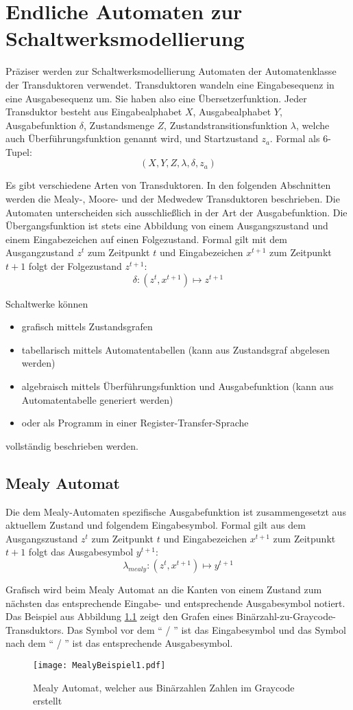\chapter{Endliche Automaten zur Schaltwerksmodellierung}
Präziser werden zur Schaltwerksmodellierung Automaten der Automatenklasse der Transduktoren verwendet. Transduktoren wandeln eine Eingabesequenz in eine Ausgabesequenz um. Sie haben also eine Übersetzerfunktion. Jeder Transduktor besteht aus Eingabealphabet $X$, Ausgabealphabet $Y$, Ausgabefunktion $\delta$, Zustandsmenge $Z$, Zustandstransitionsfunktion $\lambda$, welche auch Überführungsfunktion genannt wird, und Startzustand $z_a$. Formal als 6-Tupel:
$$
	(X,Y,Z,\lambda,\delta,z_a)
$$ 

Es gibt verschiedene Arten von Transduktoren. In den folgenden Abschnitten werden die Mealy-, Moore- und der Medwedew Transduktoren beschrieben. Die Automaten unterscheiden sich ausschließlich in der Art der Ausgabefunktion. Die Übergangsfunktion ist stets eine Abbildung von einem Ausgangszustand und einem Eingabezeichen auf einen Folgezustand. Formal gilt mit dem Ausgangzustand $z^t$ zum Zeitpunkt $t$ und Eingabezeichen $x^{t+1}$ zum Zeitpunkt $t+1$ folgt der Folgezustand $z^{t+1}$:
$$
	\delta : (z^t, x^{t+1}) \mapsto z^{t+1}
$$

Schaltwerke können
\begin{itemize}
  \item grafisch mittels Zustandsgrafen
  \item tabellarisch mittels Automatentabellen (kann aus Zustandsgraf abgelesen werden)
  \item algebraisch mittels Überführungsfunktion und Ausgabefunktion (kann aus Automatentabelle generiert werden)
  \item oder als Programm in einer Register-Transfer-Sprache
\end{itemize}
vollständig beschrieben werden.

\section{Mealy Automat}
Die dem Mealy-Automaten spezifische Ausgabefunktion ist zusammengesetzt aus aktuellem Zustand und folgendem Eingabesymbol. Formal gilt aus dem Ausgangszustand $z^t$ zum Zeitpunkt $t$ und Eingabezeichen $x^{t+1}$ zum Zeitpunkt $t+1$ folgt das Ausgabesymbol $y^{t+1}$:
$$
	\lambda_{mealy} : (z^t, x^{t+1}) \mapsto y^{t+1}
$$

Grafisch wird beim Mealy Automat an die Kanten von einem Zustand zum nächsten das entsprechende Eingabe- und entsprechende Ausgabesymbol notiert. Das Beispiel aus Abbildung \ref{mealyBsp1} zeigt den Grafen eines Binärzahl-zu-Graycode-Transduktors. Das Symbol vor dem "` / "' ist das Eingabesymbol und das Symbol nach dem "` / "' ist das entsprechende Ausgabesymbol.
\begin{figure}[htp]
	\centering
	\texttt{[image: MealyBeispiel1.pdf]}
	\caption{Mealy Automat, welcher aus Binärzahlen Zahlen im Graycode erstellt}
	\label{mealyBsp1}
\end{figure}

